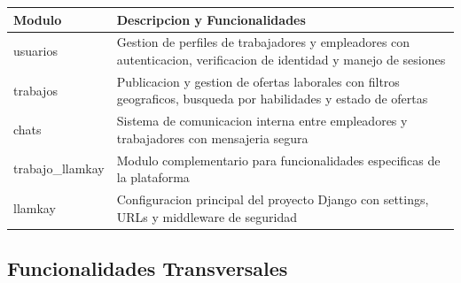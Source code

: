 \documentclass[12pt, a4paper]{article}
\begin{document}
\begin{longtable}{|p{3cm}|p{10cm}|}
\hline
\textbf{Modulo} & \textbf{Descripcion y Funcionalidades} \\
\hline
\endhead

usuarios & Gestion de perfiles de trabajadores y empleadores con autenticacion, verificacion de identidad y manejo de sesiones \\
\hline
trabajos & Publicacion y gestion de ofertas laborales con filtros geograficos, busqueda por habilidades y estado de ofertas \\
\hline
chats & Sistema de comunicacion interna entre empleadores y trabajadores con mensajeria segura \\
\hline
trabajo\_llamkay & Modulo complementario para funcionalidades especificas de la plataforma \\
\hline
llamkay & Configuracion principal del proyecto Django con settings, URLs y middleware de seguridad \\
\hline
\end{longtable}

\subsection{Funcionalidades Transversales}
\end{document}
